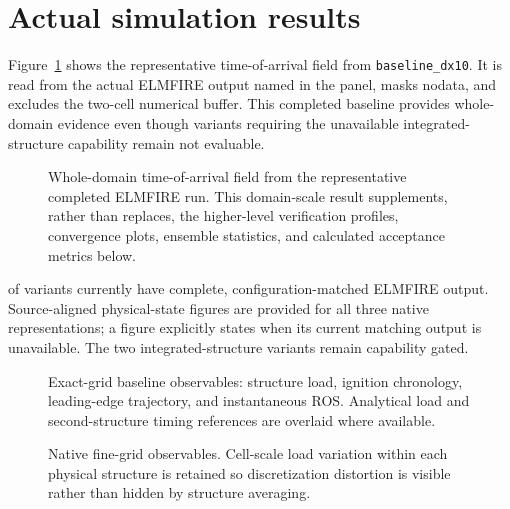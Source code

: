 \clearpage
\section{Actual simulation results}

Figure~\ref{fig:domain-result} shows the representative time-of-arrival field from \texttt{baseline\_dx10}.
It is read from the actual ELMFIRE output named in the panel, masks nodata, and excludes
the two-cell numerical buffer.  This completed baseline provides whole-domain evidence even though variants requiring the unavailable integrated-structure capability remain not evaluable.

\begin{figure}[H]
\centering
{}
\caption{Whole-domain time-of-arrival field from the representative completed ELMFIRE run.  This
domain-scale result supplements, rather than replaces, the higher-level verification
profiles, convergence plots, ensemble statistics, and calculated acceptance metrics below.}
\label{fig:domain-result}
\end{figure}


\CompletedVariantCount{} of \RequestedVariantCount{} variants currently have
complete, configuration-matched ELMFIRE output. Source-aligned physical-state
figures are provided for all three native representations; a figure explicitly
states when its current matching output is unavailable. The two
integrated-structure variants remain capability gated.

\begin{figure}[H]
\centering
{}
\caption{Exact-grid baseline observables: structure load, ignition chronology,
leading-edge trajectory, and instantaneous ROS. Analytical load and
second-structure timing references are overlaid where available.}
\label{fig:wsr-baseline}
\end{figure}

\begin{figure}[H]
\centering
{}
\caption{Native fine-grid observables. Cell-scale load variation within each
physical structure is retained so discretization distortion is visible rather
than hidden by structure averaging.}
\label{fig:wsr-fine}
\end{figure}

